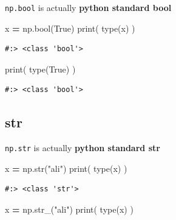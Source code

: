 \documentclass[
]{book}
\newenvironment{Shaded}{\begin{snugshade}}{\end{snugshade}}
\newcommand{\BuiltInTok}[1]{#1}
\newcommand{\NormalTok}[1]{#1}
\newcommand{\OperatorTok}[1]{\textcolor[rgb]{0.43,0.43,0.43}{\textbf{#1}}}
\newcommand{\StringTok}[1]{\textcolor[rgb]{0.5,0.5,0.5}{#1}}
\newcommand{\VariableTok}[1]{\textcolor[rgb]{0,0,0}{#1}}
\begin{document}
\texttt{np.bool} is actually \textbf{python standard bool}

\begin{Shaded}
\begin{Highlighting}[]
\NormalTok{x }\OperatorTok{=}\NormalTok{ np.}\BuiltInTok{bool}\NormalTok{(}\VariableTok{True}\NormalTok{)}
\BuiltInTok{print}\NormalTok{( }\BuiltInTok{type}\NormalTok{(x) )}
\end{Highlighting}
\end{Shaded}

\begin{verbatim}
#:> <class 'bool'>
\end{verbatim}

\begin{Shaded}
\begin{Highlighting}[]
\BuiltInTok{print}\NormalTok{( }\BuiltInTok{type}\NormalTok{(}\VariableTok{True}\NormalTok{) )}
\end{Highlighting}
\end{Shaded}

\begin{verbatim}
#:> <class 'bool'>
\end{verbatim}

\hypertarget{str}{%
\subsection{str}\label{str}}

\texttt{np.str} is actually \textbf{python standard str}

\begin{Shaded}
\begin{Highlighting}[]
\NormalTok{x }\OperatorTok{=}\NormalTok{ np.}\BuiltInTok{str}\NormalTok{(}\StringTok{"ali"}\NormalTok{)}
\BuiltInTok{print}\NormalTok{( }\BuiltInTok{type}\NormalTok{(x) )}
\end{Highlighting}
\end{Shaded}

\begin{verbatim}
#:> <class 'str'>
\end{verbatim}

\begin{Shaded}
\begin{Highlighting}[]
\NormalTok{x }\OperatorTok{=}\NormalTok{ np.str_(}\StringTok{"ali"}\NormalTok{)}
\BuiltInTok{print}\NormalTok{( }\BuiltInTok{type}\NormalTok{(x) )}
\end{Highlighting}
\end{Shaded}
\end{document}
